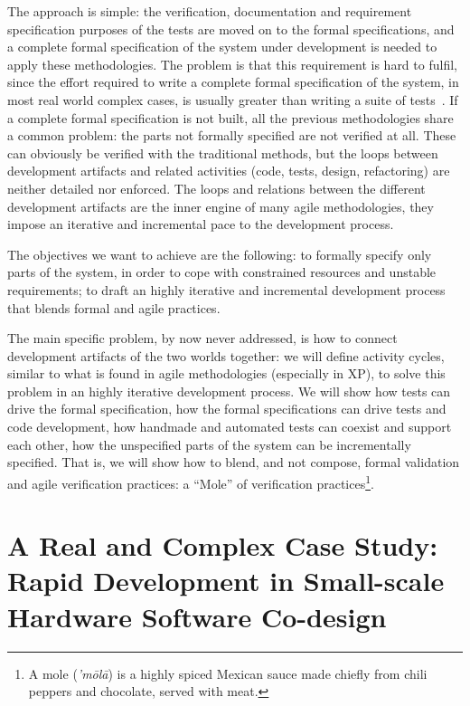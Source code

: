 \documentclass[english]{lni}
\begin{document}
The approach is simple: the verification, documentation and requirement specification purposes of the tests are moved on to the formal specifications, and a complete formal specification of the system under development is needed to apply these methodologies.
The problem is that this requirement is hard to fulfil, since the effort required to write a complete formal specification of the system, in most real world complex cases, is usually greater than writing a suite of tests~\cite{Glass2002}.
If a complete formal specification is not built, all the previous methodologies share a common problem: the parts not formally specified are not verified at all.
These can obviously be verified with the traditional methods, but the loops between development artifacts and related activities (code, tests, design, refactoring) are neither detailed nor enforced.
The loops and relations between the different development artifacts are the inner engine of many agile methodologies, they impose an iterative and incremental pace to the development process.

The objectives we want to achieve are the following: to formally specify only parts of the system, in order to cope with constrained resources and unstable requirements; to draft an highly iterative and incremental development process that blends formal and agile practices.

The main specific problem, by now never addressed, is how to connect development artifacts of the two worlds together: we will define activity cycles, similar to what is found in agile methodologies (especially in XP), to solve this problem in an highly iterative development process.
We will show how tests can drive the formal specification, how the formal specifications can drive tests and code development, how handmade and automated tests can coexist and support each other, how the unspecified parts of the system can be incrementally specified.
That is, we will show how to blend, and not compose, formal validation and agile verification practices: a ``Mole'' of verification practices\footnote{A mole (\emph{'m\=ol\=a}) is a highly spiced Mexican sauce made chiefly from chili peppers and chocolate, served with meat.}.



\section{A Real and Complex Case Study: \\ Rapid Development in Small-scale Hardware Software Co-design}
\label{subsec:a_real_and_complex_case_study}
\end{document}
